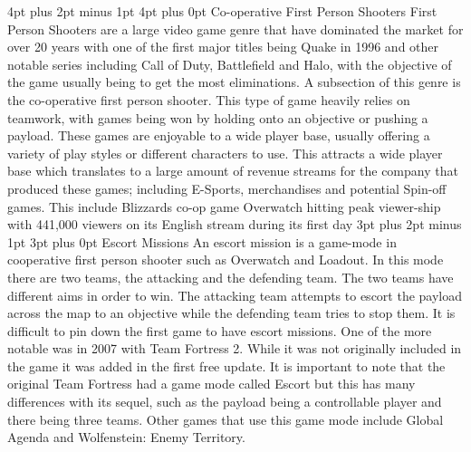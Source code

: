 \documentclass[12pt,a4paper,oneside]{book}
\makeatletter
\renewcommand\subsection{\@startsection {subsection}{1}{2mm} %
                               {3pt plus 2pt minus 1pt} %
                               {3pt plus 0pt} %
                               {\normalfont\bfseries}}
\renewcommand\section{\@startsection {section}{1}{0mm} %
                               {4pt plus 2pt minus 1pt} %
                               {4pt plus 0pt} %
                               {\bfseries}}
\makeatother
\begin{document}
\section{Co-operative First Person Shooters}
First Person Shooters are a large video game genre that have dominated the market for over 20 years with one of the first major titles being Quake in 1996 and other notable series including Call of Duty, Battlefield and Halo, with the objective of the game usually being to get the most eliminations. 
\vspace{5mm} 
\newline
A subsection of this genre is the co-operative first person shooter. This type of game heavily relies on teamwork, with games being won by holding onto an objective or pushing a payload. These games are enjoyable to a wide player base, usually offering a variety of play styles or different characters to use. This attracts a wide player base which translates to a large amount of revenue streams for the company that produced these games; including E-Sports, merchandises and potential Spin-off games. This include Blizzards co-op game Overwatch hitting peak viewer-ship with 441,000 viewers on its English stream during its first day \cite{LukeChristou}
\subsection{Escort Missions}
An escort mission is a game-mode in cooperative first person shooter such as Overwatch and Loadout. In this mode there are two teams, the attacking and the defending team. The two teams have different aims in order to win. The attacking team attempts to escort the payload across the map to an objective while the defending team tries to stop them. It is difficult to pin down the first game to have escort missions. One of the more notable was in 2007 with Team Fortress 2. While it was not originally included in the game it was added in the first free update. It is important to note that the original Team Fortress had a game mode called Escort but this has many differences with its sequel, such as the payload being a controllable player and there being three teams. Other games that use this game mode include Global Agenda and Wolfenstein: Enemy Territory.    
\vspace{5mm} 
\newline
\end{document}
